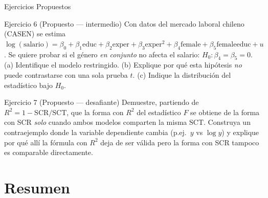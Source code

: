 \documentclass{beamer}
\begin{document}
\begin{frame}{Ejercicios Propuestos}

\begin{block}{Ejercicio 6 (Propuesto — intermedio)}
Con datos del mercado laboral chileno (CASEN) se estima $\log(\text{salario})=\beta_0+\beta_1\text{educ}+\beta_2\text{exper}+\beta_3\text{exper}^2+\beta_4\text{female}+\beta_5\text{femaleeduc}+u$. Se quiere probar si el género \emph{en conjunto} no afecta el salario: $H_0:\beta_4=\beta_5=0$. (a) Identifique el modelo restringido. (b) Explique por qué esta hipótesis \emph{no} puede contrastarse con una sola prueba $t$. (c) Indique la distribución del estadístico bajo $H_0$.
\end{block}

\pause

\begin{block}{Ejercicio 7 (Propuesto — desafiante)}
Demuestre, partiendo de $R^2 = 1-\text{SCR}/\text{SCT}$, que la forma con $R^2$ del estadístico $F$ se obtiene de la forma con SCR \emph{solo} cuando ambos modelos comparten la misma $\text{SCT}$. Construya un contraejemplo donde la variable dependiente cambia (p.ej.\ $y$ vs $\log y$) y explique por qué allí la fórmula con $R^2$ deja de ser válida pero la forma con SCR tampoco es comparable directamente.
\end{block}

\end{frame}

\section{Resumen}
\end{document}
